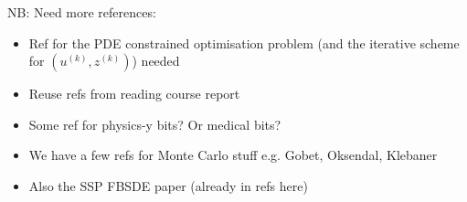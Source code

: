 \documentclass{article}  %
\begin{document}
NB: Need more references: 

\begin{itemize}
    \item Ref for the PDE constrained optimisation problem (and the iterative scheme for $(u^{(k)},z^{(k)})$) needed
    \item Reuse refs from reading course report 
    \item Some ref for physics-y bits? Or medical bits?
    \item We have a few refs for Monte Carlo stuff e.g. Gobet, Oksendal, Klebaner
    \item Also the SSP FBSDE paper (already in refs here)
\end{itemize}






















% 
% 
\newpage
\nocite{*}
\printbibliography
\end{document}
